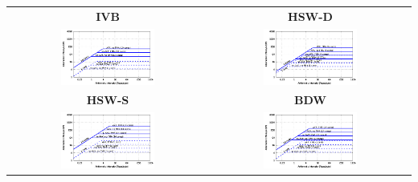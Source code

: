 
 \begin{tabular}{cc}
 \multicolumn{1}{c}{\tiny \bfseries IVB} & \multicolumn{1}{c}{\tiny \bfseries
HSW-D} \\
  \includegraphics[width=0.49\textwidth,clip=true]{images/roofline/roofline_IVB.pdf}%
  & 
  \includegraphics[width=0.49\textwidth,clip=true]{images/roofline/roofline_HSW-D.pdf}%
  \\
  
\multicolumn{1}{c}{\tiny \bfseries HSW-S} & \multicolumn{1}{c}{\tiny
\bfseries BDW} \\
  \includegraphics[width=0.49\textwidth,clip=true]{images/roofline/roofline_HSW-S.pdf}%
  & 
  \includegraphics[width=0.49\textwidth,clip=true]{images/roofline/roofline_BDW.pdf}%
  \\
  

\end{tabular}
